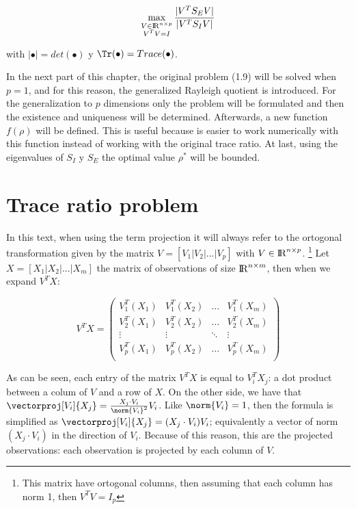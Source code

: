 \begin{equation} \label{eq:2.8}
	\max_{\substack{V \in {\rm I\!R}^{n \times p} \\ V^T V = I}} \frac{|V^T S_E V|}{|V^T S_I V|} 	
\end{equation}

with $|\bullet| = det(\bullet)$ y $\Tr(\bullet) = Trace(\bullet)$.

In the next part of this chapter, the original problem (1.9) will be solved when $p = 1$, and for this reason, the generalized Rayleigh quotient is introduced. For the generalization to $p$ dimensions only the problem will be formulated and then the existence and uniqueness will be determined. Afterwards, a new function $f(\rho)$ will be defined. This is useful because is easier to work numerically with this function instead of working with the original trace ratio. At last, using the eigenvalues of $S_I$ y $S_E$ the optimal value $\rho^*$ will be bounded.

\section{Trace ratio problem}

In this text, when using the term projection it will always refer to the ortogonal transformation given by the matrix $V = [V_1 | V_2 | ... | V_p ]$ with $V \in {\rm I\!R}^{n \times p}$. \footnote{This matrix have ortogonal columns, then assuming that each column has norm 1, then $V^T V = I_p$} Let $X = [X_1 | X_2 | ... | X_m ]$ the matrix of observations of size ${\rm I\!R}^{n \times m}$, then when we expand $V^T X$:

\begin{equation*}
V^T X= \left(\!
    \begin{array}{cccc}
      V_1^T (X_1) &  V_1^T (X_2) & \hdots & V_1^T (X_m) \\
      V_2^T (X_1) &  V_2^T (X_2) & \hdots & V_2^T (X_m) \\
      \vdots & \vdots & \ddots & \vdots\\
      V_p^T (X_1) &  V_p^T (X_2) & \hdots & V_p^T (X_m) \\
    \end{array}
  \!\right) 
\end{equation*} 

As can be seen, each entry of the matrix $V^T X$ is equal to $V_i^T X_j$: a dot product between a colum of $V$ and a row of $X$. On the other side, we have that $\vectorproj[V_i]{X_j} = \frac{X_j \cdot V_i}{\norm{V_i}^2} V_i$. Like $\norm{V_i} = 1$, then the formula is simplified as $\vectorproj[V_i]{X_j} = (X_j \cdot V_i) V_i$; equivalently a vector of norm $(X_j \cdot V_i)$ in the direction of $V_i$. Because of this reason, this are the projected observations: each observation is projected by each column of $V$.

